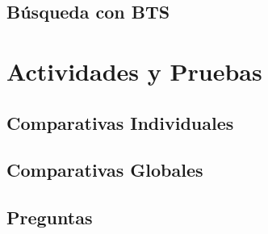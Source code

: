 \documentclass[12pt, fleqn]{article}                             %
\theoremstyle{break}                                            %
\begin{document}
    \subsection{Búsqueda con BTS}
        





\clearpage
\section{Actividades y Pruebas}


    \subsection{Comparativas Individuales}


    \subsection{Comparativas Globales}


    \subsection{Preguntas}
\end{document}
